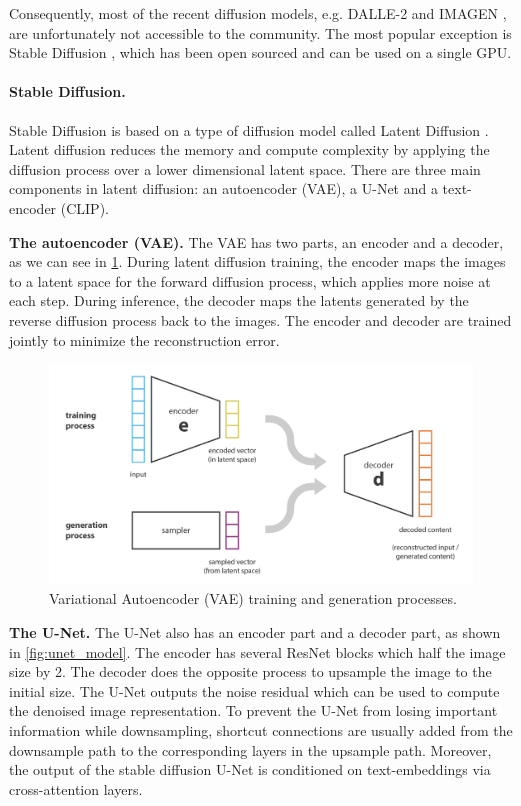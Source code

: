 Consequently, most of the recent diffusion models, e.g. DALLE-2 \cite{ramesh2022hierarchical} and IMAGEN \cite{saharia2022photorealistic}, are unfortunately not accessible to the community. The most popular exception is Stable Diffusion \cite{rombach2021highresolution}, which has been open sourced and can be used on a single GPU.

\paragraph{Stable Diffusion.}

Stable Diffusion is based on a type of diffusion model called Latent Diffusion \cite{rombach2021highresolution}. Latent diffusion reduces the memory and compute complexity by applying the diffusion process over a lower dimensional latent space. There are three main components in latent diffusion: an autoencoder (VAE), a U-Net and a text-encoder (CLIP).

\textbf{The autoencoder (VAE).} The VAE \cite{kingma2013auto} has two parts, an encoder and a decoder, as we can see in \cref{fig:vae}. During latent diffusion training, the encoder maps the images to a latent space for the forward diffusion process, which applies more noise at each step. During inference, the decoder maps the latents generated by the reverse diffusion process back to the images. The encoder and decoder are trained jointly to minimize the reconstruction error.

\begin{figure}[ht]
    \centering
    \includegraphics[width=\linewidth]{images/diffusion/vae.png}
    \caption{Variational Autoencoder (VAE) training and generation processes.}
    \label{fig:vae}
\end{figure}

\textbf{The U-Net.} The U-Net \cite{ronneberger2015u} also has an encoder part and a decoder part, as shown in \cref{fig:unet_model}. The encoder has several ResNet blocks which half the image size by 2. The decoder does the opposite process to upsample the image to the initial size. The U-Net outputs the noise residual which can be used to compute the denoised image representation. To prevent the U-Net from losing important information while downsampling, shortcut connections are usually added from the downsample path to the corresponding layers in the upsample path. Moreover, the output of the stable diffusion U-Net is conditioned on text-embeddings via cross-attention layers.

